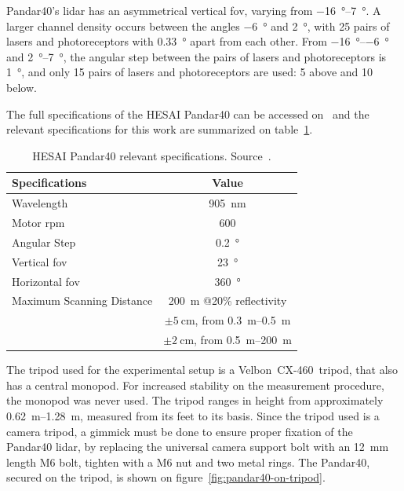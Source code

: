 Pandar40's \ac{lidar} has an asymmetrical vertical \ac{fov}, varying from \SIrange{-16}{+7}{\degree}. A larger channel density occurs between the angles \SI{-6}{\degree} and \SI{+2}{\degree}, with 25 pairs of lasers and photoreceptors with \SI{0.33}{\degree} apart from each other. From \SIrange{-16}{-6}{\degree} and \SIrange{+2}{+7}{\degree}, the angular step between the pairs of lasers and photoreceptors is \SI{1}{\degree}, and only 15 pairs of lasers and photoreceptors are used: 5 above and 10 below.

The full specifications of the HESAI Pandar40 can be accessed on~\cite{Pandar40UserGuide} and the relevant specifications for this work are summarized on table~\ref{tab:pandar40-specs}.

\begin{table}[H]
\centering
\renewcommand{\arraystretch}{1.2}
\begin{tabular}{@{}p{6cm}c@{}}
	\toprule
	Specifications & Value \\
	\midrule
	Wavelength & \SI{905}{\nano\meter} \\
	Motor \ac{rpm} & 600 \\
	Angular Step & \SI{0.2}{\degree} \\
	Vertical \ac{fov} & \SI{23}{\degree} \\
	Horizontal \ac{fov} & \SI{360}{\degree} \\
	Maximum Scanning Distance & \SI{200}{\meter} @20\% reflectivity \\
																				 & $\pm \SI{5}{\centi\meter}$, from \SIrange{0.3}{0.5}{\meter} \\
	\rowcolor{white} \multirow{-2}{*}{Measurement Accuracy} & $\pm \SI{2}{\centi\meter}$, from \SIrange{0.5}{200}{\meter} \\
	\bottomrule
\end{tabular}
\caption{HESAI Pandar40 relevant specifications. Source~\cite{Pandar40UserGuide}.}
\label{tab:pandar40-specs}
\end{table}

The tripod used for the experimental setup is a Velbon\cp~CX-460\texttrademark~tripod, that also has a central monopod. For increased stability on the measurement procedure, the monopod was never used. The tripod ranges in height from approximately \SIrange{0.62}{1.28}{\meter}, measured from its feet to its basis. Since the tripod used is a camera tripod, a gimmick must be done to ensure proper fixation of the Pandar40 \ac{lidar}, by replacing the universal camera support bolt with an \SI{12}{\milli\meter} length M6 bolt, tighten with a M6 nut and two metal rings. The Pandar40, secured on the tripod, is shown on figure~\ref{fig:pandar40-on-tripod}.

